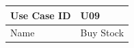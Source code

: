 \documentclass[12pt]{article}
\begin{document}
\begin{table}[H]
\begin{tabular}{|l|l|}
\hline
Use Case ID & U09                                                                                                                                                                                                                                                                                                                                                                                                                                                                                                                                                                                                                                                                                                                                                                                                                                                                                                                                                                                                                                                                                                                                                                                                          \\ \hline
Name        & Buy Stock                                                                                                                                                                                                                                                                                                                                                                                                                                                                                                                                                                                                                                                                                                                                                                                                                                                                                                                                                                                                                                                                                                                                                                                                    \\ \hline

\end{tabular}
\end{table}
\end{document}

